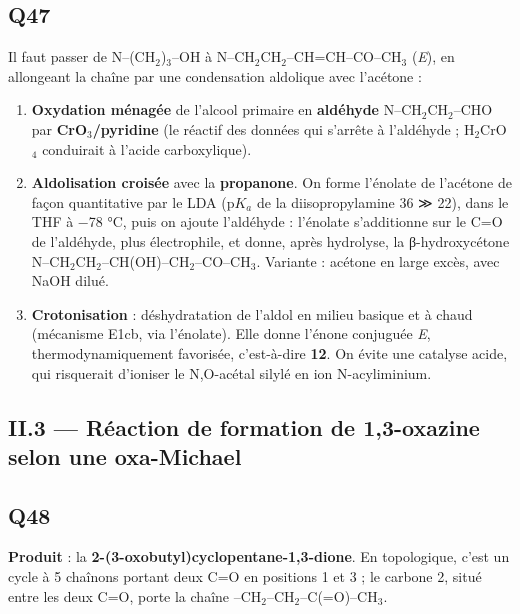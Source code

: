 \documentclass[11pt,a4paper]{article}
\providecommand{\tightlist}{\setlength{\itemsep}{0pt}\setlength{\parskip}{0pt}}
\begin{document}
\hypertarget{q47}{%
\subsection{Q47}\label{q47}}

Il faut passer de N--(CH\(_2\))\(_3\)--OH à N--CH\(_2\)CH\(_2\)--CH=CH--CO--CH\(_3\) (\emph{E}), en allongeant la chaîne par une condensation aldolique avec l'acétone :

\begin{enumerate}
\def\labelenumi{\arabic{enumi}.}
\tightlist
\item
  \textbf{Oxydation ménagée} de l'alcool primaire en \textbf{aldéhyde} N--CH\(_2\)CH\(_2\)--CHO par \textbf{CrO\(_3\)/pyridine} (le réactif des données qui s'arrête à l'aldéhyde ; H\(_2\)CrO\(_4\) conduirait à l'acide carboxylique).
\item
  \textbf{Aldolisation croisée} avec la \textbf{propanone}. On forme l'énolate de l'acétone de façon quantitative par le LDA (p\(K_a\) de la diisopropylamine 36 ≫ 22), dans le THF à −78 °C, puis on ajoute l'aldéhyde : l'énolate s'additionne sur le C=O de l'aldéhyde, plus électrophile, et donne, après hydrolyse, la β-hydroxycétone N--CH\(_2\)CH\(_2\)--CH(OH)--CH\(_2\)--CO--CH\(_3\). Variante : acétone en large excès, avec NaOH dilué.
\item
  \textbf{Crotonisation} : déshydratation de l'aldol en milieu basique et à chaud (mécanisme E1cb, via l'énolate). Elle donne l'énone conjuguée \emph{E}, thermodynamiquement favorisée, c'est-à-dire \textbf{12}. On évite une catalyse acide, qui risquerait d'ioniser le N,O-acétal silylé en ion N-acyliminium.
\end{enumerate}

\hypertarget{ii.3-ruxe9action-de-formation-de-13-oxazine-selon-une-oxa-michael}{%
\subsection{II.3 --- Réaction de formation de 1,3-oxazine selon une oxa-Michael}\label{ii.3-ruxe9action-de-formation-de-13-oxazine-selon-une-oxa-michael}}

\hypertarget{q48}{%
\subsection{Q48}\label{q48}}

\textbf{Produit} : la \textbf{2-\allowbreak{}(3-\allowbreak{}oxobutyl)cyclopentane-\allowbreak{}1,3-\allowbreak{}dione}. En topologique, c'est un cycle à 5 chaînons portant deux C=O en positions 1 et 3 ; le carbone 2, situé entre les deux C=O, porte la chaîne --CH\(_2\)--CH\(_2\)--C(=O)--CH\(_3\).
\end{document}
